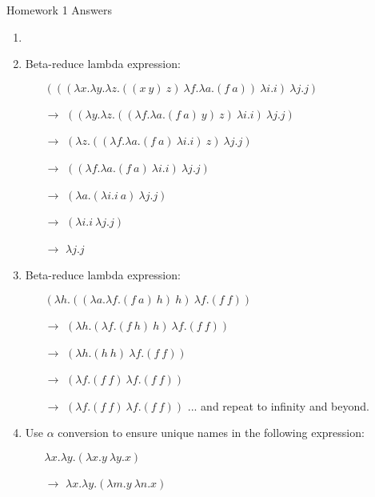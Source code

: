 \documentclass[12pt]{letter}
\begin{document}
	\begin{center}
		\begin{large} Homework 1 Answers \end{large}
	\end{center}

	\begin{enumerate}

		\item
		
		\item Beta-reduce lambda expression:
		\begin{itemize}
			\item[] $(((\lambda x.\lambda y.\lambda z.((x~y)~z)~\lambda f.\lambda a.(f~a))~\lambda i.i)~\lambda j.j)$
			\item[$\rightarrow$]
			$((\lambda y.\lambda z.((\lambda f.\lambda a.(f~a)~y)~z)~\lambda i.i)~\lambda j.j)$
			\item[$\rightarrow$]
			$(\lambda z.((\lambda f.\lambda a.(f~a)~\lambda i.i)~z)~\lambda j.j)$
			\item[$\rightarrow$]
			$((\lambda f.\lambda a.(f~a)~\lambda i.i)~\lambda j.j)$
			\item[$\rightarrow$]
			$(\lambda a.(\lambda i.i~a)~\lambda j.j)$
			\item[$\rightarrow$]
			$(\lambda i.i~\lambda j.j)$
			\item[$\rightarrow$]
			$\lambda j.j$
		\end{itemize}
		
		\item Beta-reduce lambda expression:
		\begin{itemize}
			\item[]
			$(\lambda h.((\lambda a.\lambda f.(f~a)~h)~h)~\lambda f.(f~f))$
			\item[$\rightarrow$]
			$(\lambda h.(\lambda f.(f~h)~h)~\lambda f.(f~f))$
			\item[$\rightarrow$]
			$(\lambda h.(h~h)~\lambda f.(f~f))$
			\item[$\rightarrow$]
			$(\lambda f.(f~f)~\lambda f.(f~f))$
			\item[$\rightarrow$]
			$(\lambda f.(f~f)~\lambda f.(f~f))$
			... and repeat to infinity and beyond.
		\end{itemize}
		
		\item Use $\alpha$ conversion to ensure unique names in the following expression:
		\begin{itemize}
			\item[]
			$\lambda x.\lambda y.(\lambda x.y~\lambda y.x)$
			\item[$\rightarrow$]
			$\lambda x.\lambda y.(\lambda m.y~\lambda n.x)$
		\end{itemize}
		

\end{enumerate}
\end{document}
